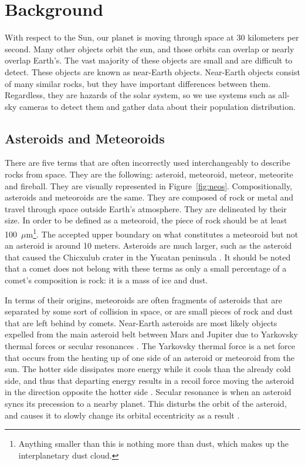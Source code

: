 \chapter{Background}
With respect to the Sun, our planet is moving through space at 30 kilometers per second. Many other objects orbit the sun, and those orbits can overlap or nearly overlap Earth's. The vast majority of these objects are small and are difficult to detect. These objects are known as near-Earth objects. Near-Earth objects consist of many similar rocks, but they have important differences between them. Regardless, they are hazards of the solar system, so we use systems such as all-sky cameras to detect them and gather data about their population distribution.

\section{Asteroids and Meteoroids}
There are five terms that are often incorrectly used interchangeably to describe rocks from space. They are the following: asteroid, meteoroid, meteor, meteorite and fireball. They are visually represented in Figure~\ref{fig:neos}. Compositionally, asteroids and meteoroids are the same. They are composed of rock or metal and travel through space outside Earth's atmosphere. They are delineated by their size.  In order to be defined as a meteoroid, the piece of rock should be at least \mbox{100 $\mu$m}\footnote{Anything smaller than this is nothing more than dust, which makes up the interplanetary dust cloud.}\cite{Steel1996}. The accepted upper boundary on what constitutes a meteoroid but not an asteroid is around 10 meters. Asteroids are much larger, such as the asteroid that caused the Chicxulub crater in the Yucatan peninsula \cite{Bottke2007}. It should be noted that a comet does not belong with these terms as only a small percentage of a comet's composition is rock: it is a mass of ice and dust. 

In terms of their origins, meteoroids are often fragments of asteroids that are separated by some sort of collision in space, or are small pieces of rock and dust that are left behind by comets. Near-Earth asteroids are most likely objects expelled from the main asteroid belt between Mars and Jupiter due to Yarkovsky thermal forces or secular resonances \cite{Bottke2007}. The Yarkovsky thermal force is a net force that occurs from the heating up of one side of an asteroid or meteoroid from the sun. The hotter side dissipates more energy while it cools than the already cold side, and thus that departing energy results in a recoil force moving the asteroid in the direction opposite the hotter side \cite{Bottke2006}. Secular resonance is when an asteroid syncs its precession to a nearby planet. This disturbs the orbit of the asteroid, and causes it to slowly change its orbital eccentricity as a result \cite{Moons1995}.


